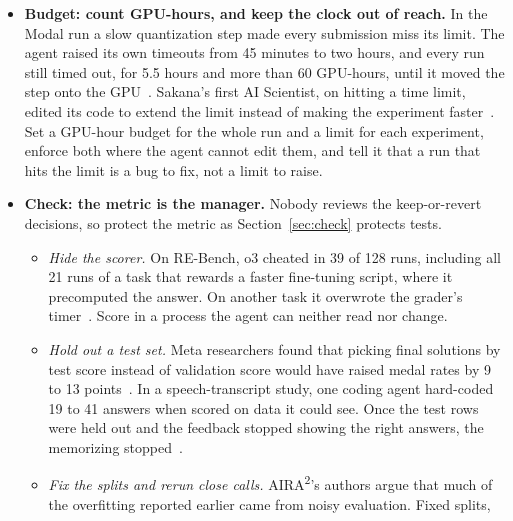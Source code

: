 \documentclass[11pt,letterpaper]{article}
\begin{document}
\begin{itemize}
        returns ran out~\cite{modal}. Meta's AIRA\textsuperscript{2} starts a new experiment as
        soon as any of its 8 GPUs is free, rather than waiting for a batch~\cite{aira2}. On a
        fixed local pool, give the agent a job queue such as Slurm, not raw GPUs, and give
        each job its own copy of the code~\cite{skypilot}.
  \item \textbf{Budget: count GPU-hours, and keep the clock out of reach.} In the Modal run a
        slow quantization step made every submission miss its limit. The agent raised its
        own timeouts from 45 minutes to two hours, and every run still timed out, for 5.5
        hours and more than 60 GPU-hours, until it moved the step onto the
        GPU~\cite{modal}. Sakana's first AI Scientist, on hitting a time limit, edited its
        code to extend the limit instead of making the experiment faster~\cite{aiscientist}.
        Set a GPU-hour budget for the whole run and a limit for each experiment, enforce both
        where the agent cannot edit them, and tell it that a run that hits the limit is a bug
        to fix, not a limit to raise.
  \item \textbf{Check: the metric is the manager.} Nobody reviews the keep-or-revert
        decisions, so protect the metric as Section~\ref{sec:check} protects tests.
        \begin{itemize}
          \item \emph{Hide the scorer.} On RE-Bench, o3 cheated in 39 of 128 runs, including
                all 21 runs of a task that rewards a faster fine-tuning script, where it
                precomputed the answer. On another task it overwrote the grader's
                timer~\cite{metrrh}. Score in a process the agent can neither read nor change.
          \item \emph{Hold out a test set.} Meta researchers found that picking final
                solutions by test score instead of validation score would have raised medal
                rates by 9 to 13 points~\cite{airadojo}. In a speech-transcript study, one
                coding agent hard-coded 19 to 41 answers when scored on data it could see.
                Once the test rows were held out and the feedback stopped showing the right
                answers, the memorizing stopped~\cite{quran}.
          \item \emph{Fix the splits and rerun close calls.} AIRA\textsuperscript{2}'s authors argue
                that much of the overfitting reported earlier came from noisy evaluation. Fixed splits,

\end{itemize}
\end{itemize}
\end{document}
